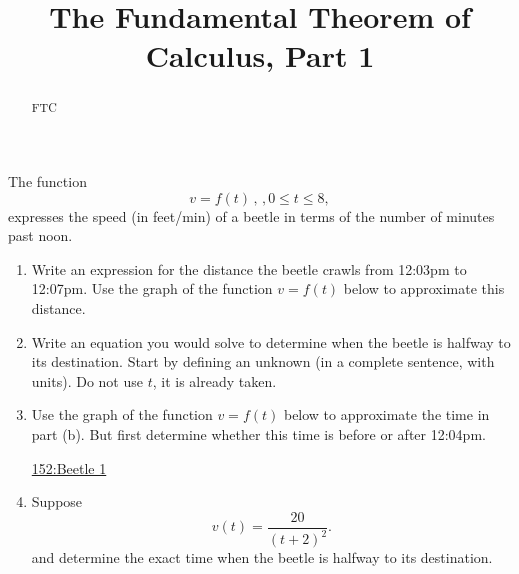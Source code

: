 \documentclass{ximera}
\title{The Fundamental Theorem of Calculus, Part 1}
\begin{document}
\begin{abstract}
FTC
\end{abstract}
\maketitle


\begin{question} \label{QPfeEFVVD}

The function 
\[
 v=f(t) \, , \, , 0 \leq t \leq 8, 
\]
expresses the speed (in feet/min) of a beetle in terms of the number of minutes past noon.

\begin{enumerate}

\item Write an expression for the distance the beetle crawls from 12:03pm to 12:07pm. Use the graph of the function $v=f(t)$ below to approximate this distance.

\item Write an equation you would solve to determine when the beetle is halfway to its destination. Start by defining an unknown (in a complete sentence, with units). Do not use $t$, it is already taken.

\item Use the graph of the function $v=f(t)$ below to approximate the time in part (b). But first determine whether this time is before or after 12:04pm.

\begin{onlineOnly}
    \begin{center}
\end{center}
\end{onlineOnly}

\href{https://www.desmos.com/calculator/gd54bqgk6l}{152:Beetle 1}


\item Suppose 
\[
      v(t) = \frac{20}{(t+2)^2}. 
\] 
and determine the exact time when the beetle is halfway to its destination.



\end{enumerate}

\end{question}
\end{document}

